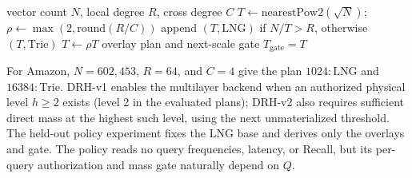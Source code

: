 \begin{algorithm}[t]
\caption{DRH structure and optional mass gate}
\label{alg:drh}
\begin{algorithmic}[1]
\Require vector count $N$, local degree $R$, cross degree $C$
\State $T\gets\mathrm{nearestPow2}(\sqrt N)$;
  $\rho\gets\max(2,\mathrm{round}(R/C))$
 \State append $(T,\mathrm{LNG})$ if $N/T>R$, otherwise $(T,\mathrm{Trie})$
 \State $T\gets\rho T$
\EndWhile
\State \Return overlay plan and next-scale gate $T_{\mathrm{gate}}=T$
\end{algorithmic}
\end{algorithm}

For Amazon, $N=602{,}453$, $R=64$, and $C=4$ give
the plan $1024{:}\mathrm{LNG}$ and $16384{:}\mathrm{Trie}$.
DRH-v1 enables the multilayer backend when an authorized physical level
$h\ge2$ exists (level 2 in the evaluated plans); DRH-v2 also requires
sufficient direct mass at the highest such level, using the
next unmaterialized threshold.  The held-out policy experiment fixes the LNG base and derives
only the overlays and gate.  The policy reads no query frequencies, latency, or Recall, but its
per-query authorization and mass gate naturally depend on $Q$.
